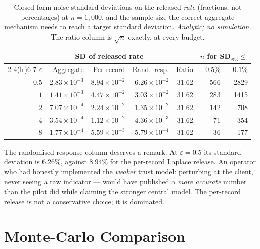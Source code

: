 \documentclass[journal]{IEEEtran}
\theoremstyle{definition}
\newcommand{\Nrec}{1{,}000}
\newcommand{\PerSDtheoryhalf}{8.94}
\newcommand{\RRSDtheoryhalf}{6.26}
\begin{document}
\begin{table}[t]
\centering
\caption{Closed-form noise standard deviations on the released \emph{rate}
(fractions, not percentages) at $n=\Nrec{}$, and the sample size the correct
aggregate mechanism needs to reach a target standard deviation. \emph{Analytic;
no simulation.} The ratio column is $\sqrt{n}$ exactly, at every budget.}
\label{tab:theory}
\small
\setlength{\tabcolsep}{4pt}
\begin{tabular}{rrrrrrr}
\toprule
 & \multicolumn{3}{c}{SD of released rate} & & \multicolumn{2}{c}{$n$ for SD$_{\mathrm{agg}} \le$} \\
\cmidrule(lr){2-4}\cmidrule(lr){6-7}
$\varepsilon$ & Aggregate & Per-record & Rand.\ resp. & Ratio & $0.5\%$ & $0.1\%$ \\
\midrule
$0.5$ & $2.83\times 10^{-3}$ & $8.94\times 10^{-2}$ & $6.26\times 10^{-2}$ & 31.62 & 566 & 2829 \\
$1$ & $1.41\times 10^{-3}$ & $4.47\times 10^{-2}$ & $3.03\times 10^{-2}$ & 31.62 & 283 & 1415 \\
$2$ & $7.07\times 10^{-4}$ & $2.24\times 10^{-2}$ & $1.35\times 10^{-2}$ & 31.62 & 142 & 708 \\
$4$ & $3.54\times 10^{-4}$ & $1.12\times 10^{-2}$ & $4.36\times 10^{-3}$ & 31.62 & 71 & 354 \\
$8$ & $1.77\times 10^{-4}$ & $5.59\times 10^{-3}$ & $5.79\times 10^{-4}$ & 31.62 & 36 & 177 \\
\bottomrule
\end{tabular}
\end{table}

The randomised-response column deserves a remark. At $\varepsilon=0.5$ its
standard deviation is \RRSDtheoryhalf\%, against \PerSDtheoryhalf\% for the
per-record Laplace release. An operator who had honestly implemented the
\emph{weaker} trust model: perturbing at the client, never seeing a raw
indicator --- would have published a \emph{more accurate} number than the pilot
did while claiming the stronger central model. The per-record release is not a
conservative choice; it is dominated.

\section{Monte-Carlo Comparison}
\label{sec:mc}
\end{document}
